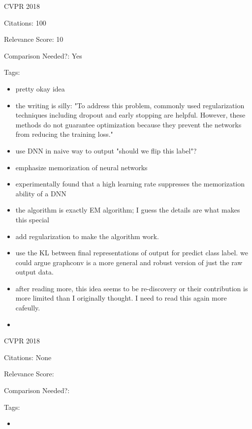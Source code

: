 \documentclass[11pt]{article}
\begin{document}
\noindent CVPR 2018

\noindent Citations: 100

\noindent Relevance Score: 10

\noindent Comparison Needed?: Yes

\noindent Tags:

\begin{itemize}
\item pretty okay idea
\item the writing is silly: "To address this problem, commonly used regularization techniques including dropout and early stopping are helpful. However, these methods do not guarantee optimization because they prevent the networks from reducing the training loss."
\item use DNN in naive way to output "should we flip this label"?
\item emphasize memorization of neural networks
\item experimentally found that a high learning rate suppresses the memorization ability of a DNN
\item the algorithm is exactly EM algorithm; I guess the details are what makes this special
\item add regularization to make the algorithm work.
\item use the KL between final representations of output for predict class label. we could argue graphconv is a more general and robust version of just the raw output data.
\item after reading more, this idea seems to be re-discovery or their contribution is more limited than I originally thought. I need to read this again more cafeully.
\end{itemize}


\begin{itemize}
\item 
\end{itemize}

\vspace{2cm}

\noindent CVPR 2018

\noindent Citations: None

\noindent Relevance Score:

\noindent Comparison Needed?: 

\noindent Tags:

\begin{itemize}
\item 
\end{itemize}
\end{document}
